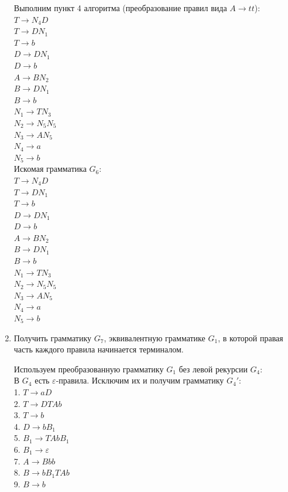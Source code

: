 \documentclass[a4paper,14pt]{extarticle}
\begin{document}
\begin{enumerate}[1.]
Выполним пункт 4 алгоритма (преобразование правил вида $A \rightarrow tt$):\\
$T \rightarrow N_4D$\\
$T \rightarrow DN_1$\\
$T \rightarrow b$\\
$D \rightarrow DN_1$\\
$D \rightarrow b$\\
$A \rightarrow BN_2$\\
$B \rightarrow DN_1$\\
$B \rightarrow b$\\
$N_1 \rightarrow TN_3$\\
$N_2 \rightarrow N_5N_5$\\
$N_3 \rightarrow AN_5$\\
$N_4 \rightarrow a$\\
$N_5 \rightarrow b$\\

Искомая грамматика $G_6$:\\
$T \rightarrow N_4D$\\
$T \rightarrow DN_1$\\
$T \rightarrow b$\\
$D \rightarrow DN_1$\\
$D \rightarrow b$\\
$A \rightarrow BN_2$\\
$B \rightarrow DN_1$\\
$B \rightarrow b$\\
$N_1 \rightarrow TN_3$\\
$N_2 \rightarrow N_5N_5$\\
$N_3 \rightarrow AN_5$\\
$N_4 \rightarrow a$\\
$N_5 \rightarrow b$\\

\item Получить грамматику $G_7$, эквивалентную грамматике $G_1$, в которой 
правая часть каждого правила начинается терминалом.

Используем преобразованную грамматику $G_1$ без левой рекурсии $G_4$:\\

В $G_4$ есть $\varepsilon$-правила. Исключим их и получим грамматику $G_4'$:\\
1. $T \rightarrow aD$\\
2. $T \rightarrow DTAb$\\
3. $T \rightarrow b$\\
4. $D \rightarrow bB_1$\\
5. $B_1 \rightarrow TAbB_1$\\
6. $B_1 \rightarrow \varepsilon$\\
7. $A \rightarrow Bbb$\\
8. $B \rightarrow bB_1TAb$\\
9. $B \rightarrow b$\\


\end{enumerate}
\end{document}
